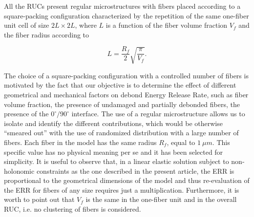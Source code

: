 \documentclass[Review,sagev,times]{sagej}
\begin{document}
All the RUCs present regular microstructures with fibers placed according to a square-packing configuration characterized by the repetition of the same one-fiber unit cell of size $2L\times2L$, where $L$ is a function of the fiber volume fraction $V_{f}$ and the fiber radius according to

\begin{equation}\label{eq:LVf}
L=\frac{R_{f}}{2}\sqrt{\frac{\pi}{V_{f}}}.
\end{equation}

The choice of a square-packing configuration with a controlled number of fibers is motivated by the fact that our objective is to determine the effect of different geometrical and mechanical factors on debond Energy Release Rate, such as fiber volume fraction, the presence of undamaged and partially debonded fibers, the presence of the $0^{\circ}/90^{\circ}$ interface. The use of a regular microstructure allows us to isolate and identify the different contributions, which would be otherwise ``smeared out'' with the use of randomized distribution with a large number of fibers. Each fiber in the model has the same radius $R_{f}$, equal to $1\ \mu m$. This specific value has no physical meaning per se and it has been selected for simplicity. It is useful to observe that, in a linear elastic solution subject to non-holonomic constraints as the one described in the present article, the ERR is proportional to the geometrical dimensions of the model and thus re-evaluation of the ERR for fibers of any size requires just a multiplication. Furthermore, it is worth to point out that $V_{f}$ is the same in the one-fiber unit and in the overall RUC, i.e. no clustering of fibers is considered.\\
\end{document}
